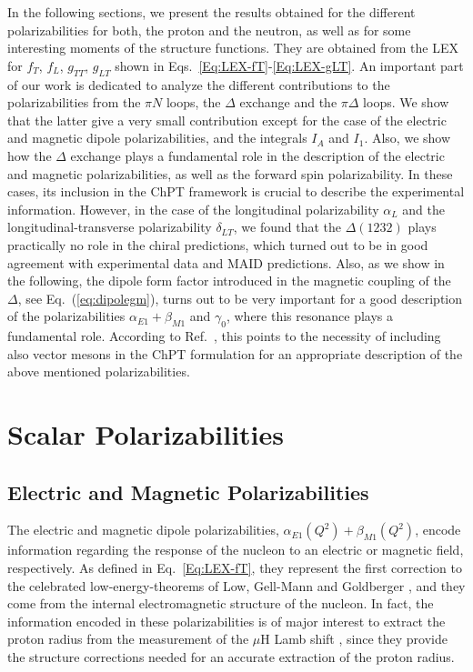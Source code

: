 \documentclass[twocolumn,prc,showpacs,nofootinbib,preprintnumbers,amsmath,amssymb,superscriptaddress]{revtex4-1}
\def\Eqref#1{Eq.~(\ref{eq:#1})}
\begin{document}
In the following sections, we present the results obtained for the different polarizabilities for both, the proton and the neutron, as well as for some interesting moments of the structure functions.
They are obtained from the LEX for $f_T$, $f_L$, $g_{TT}$, $g_{LT}$ shown in Eqs.~\eqref{Eq:LEX-fT}-\eqref{Eq:LEX-gLT}.
An important part of our work is dedicated to analyze the different contributions to the polarizabilities from the $\pi N$ loops, the $\Delta$ exchange and the $\pi\Delta$ loops.
We show that the latter give a very small contribution except for the case of the electric and magnetic dipole polarizabilities, and the integrals $I_A$ and $I_1$.
Also, we show how the $\Delta$ exchange plays a fundamental role in the description of the electric and magnetic polarizabilities, as well as the forward spin polarizability. 
In these cases, its inclusion in the ChPT framework is crucial to describe the experimental information. 
However, in the case of the longitudinal polarizability $\alpha_L$ and the longitudinal-transverse polarizability $\delta_{LT}$, we found that the $\Delta(1232)$ plays practically no role in the chiral predictions, which turned out to be in good agreement with experimental data and MAID predictions.
Also, as we show in the following, the dipole form factor introduced in the magnetic coupling of the $\Delta$, see \Eqref{dipolegm}, turns out to be very important for a good description of the polarizabilities $\alpha_{E1}+\beta_{M1}$ and $\gamma_0$, where this resonance plays a fundamental role. 
According to Ref.~\cite{Pascalutsa:2005vq}, this points to the necessity of including also vector mesons in the ChPT formulation for an appropriate description of the above mentioned polarizabilities.
 

\section{Scalar Polarizabilities}
\label{Sec:Scalar-Pol}

\subsection{Electric and Magnetic Polarizabilities}

The electric and magnetic dipole polarizabilities, $\alpha_{E1}(Q^2)+\beta_{M1}(Q^2)$, encode information regarding the response of the nucleon to an electric or magnetic field, respectively.
As defined in Eq.~\eqref{Eq:LEX-fT}, they represent the first correction to the celebrated low-energy-theorems of Low, Gell-Mann and Goldberger \cite{LET}, and they come from the internal electromagnetic structure of the nucleon.
In fact, the information encoded in these polarizabilities is of major interest to extract the proton radius from the measurement of the $\mu$H Lamb shift \cite{Birse:2012eb,Alarcon:2013cba,Carlson:2011zd,Nevado:2007dd,Peset:2014yha,Hagelstein:2017cbl}, since they provide the structure corrections needed for an accurate extraction of the proton radius.
\end{document}
